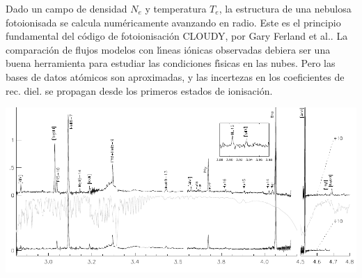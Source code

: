 Dado un campo de densidad $N_e$ y temperatura $T_e$, la estructura de
una nebulosa fotoionisada se calcula num\'ericamente avanzando en
radio. Este es el principio fundamental del c\'odigo de
fotoionisaci\'on {\small CLOUDY}, por Gary Ferland et al.. La
comparaci\'on de flujos modelos con l\'{\i}neas i\'onicas observadas
debiera ser una buena herramienta para estudiar las condiciones
f\'{\i}sicas en las nubes. Pero las bases de datos at\'omicos son
aproximadas, y las incertezas en los coeficientes de rec. diel. se
propagan desde los primeros estados de ionisaci\'on. \\




\vspace{5cm}
\begin{center}
  \includegraphics[width=25cm,height=!]{specCGS4.pdf}
\end{center}



